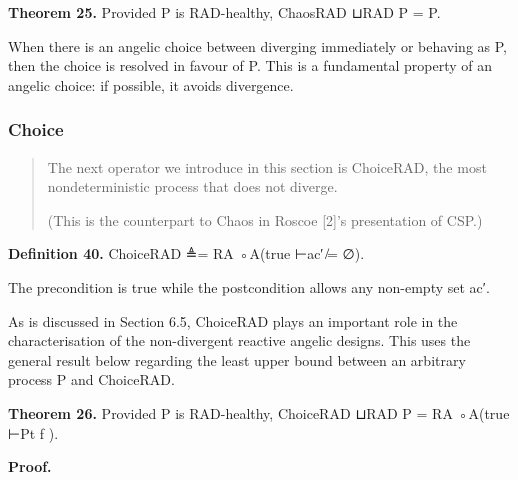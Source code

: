 \documentclass[11pt]{article}
\begin{document}
\noindent\textbf{Theorem 25.} Provided P is RAD-healthy, ChaosRAD ⊔RAD P = P.


When there is an angelic choice between diverging immediately or behaving as P, then the choice is resolved in favour of P. This is a fundamental property of an angelic choice: if possible, it avoids divergence.

\subsubsection{Choice}
\begin{quote}\small\raggedright
The next operator we introduce in this section is ChoiceRAD, the most nondeterministic process that does not diverge.
\par
(This is the counterpart to Chaos in Roscoe [2]’s presentation of CSP.)
\end{quote}

\noindent\textbf{Definition 40.} ChoiceRAD ≜= RA ◦A(true ⊢ac′ ̸= ∅).


The precondition is true while the postcondition allows any non-empty set ac′.

As is discussed in Section 6.5, ChoiceRAD plays an important role in the characterisation of the non-divergent reactive angelic designs. This uses the general result below regarding the least upper bound between an arbitrary process P and ChoiceRAD.

\noindent\textbf{Theorem 26.} Provided P is RAD-healthy, ChoiceRAD ⊔RAD P = RA ◦A(true ⊢Pt f ).


\noindent\textbf{Proof.}
\end{document}
